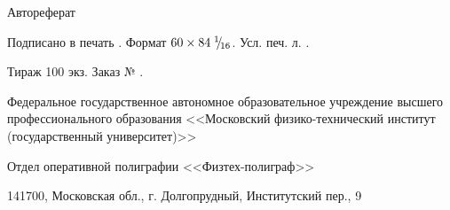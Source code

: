 \clearpage

\phantom{top}
\vspace{0pt plus5fill} %
\begin{center}
\thesisAuthor
\end{center}

\vspace{0pt plus1fill}
\begin{center}
\large \thesisTitle
\vspace{0pt plus.5fill}
\large{Автореферат}
\end{center}

\vspace{0pt plus1fill}
\FPeval{}\FPeval{}
\begin{center}
Подписано в печать . Формат $60 \times 84\; {}^{1}\mkern-5mu/{\!}_{16}$. Усл. печ. л. .

Тираж 100 экз. Заказ № .

Федеральное государственное автономное образовательное учреждение высшего профессионального образования
<<Московский физико-технический институт (государственный университет)>>

Отдел оперативной полиграфии <<Физтех-полиграф>>

141700, Московская обл., г. Долгопрудный, Институтский пер., 9
\end{center}

\vspace{0pt plus3fill}
\phantom{bottom}